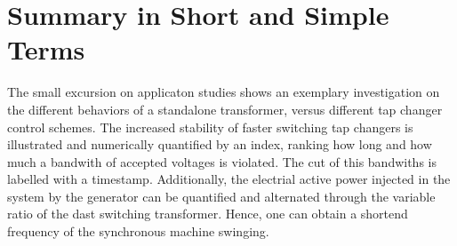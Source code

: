 \section{Summary in Short and Simple Terms}

The small excursion on applicaton studies shows an exemplary investigation on the different behaviors of a standalone transformer, versus different tap changer control schemes.
The increased stability of faster switching tap changers is illustrated and numerically quantified by an index, ranking how long and how much a bandwith of accepted voltages is violated.
The cut of this bandwiths is labelled with a timestamp.
Additionally, the electrial active power injected in the system by the generator can be quantified and alternated through the variable ratio of the dast switching transformer.
Hence, one can obtain a shortend frequency of the synchronous machine swinging.